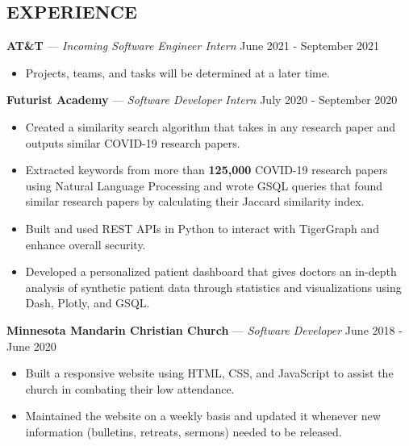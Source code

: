 \documentclass[11pt]{res}
\begin{document}
\begin{footnotesize}
\begin{resume}
\begin{small}
\section{EXPERIENCE}
\end{small}
\vspace{.5mm}
\textbf{AT\&T} — {\sl Incoming Software Engineer Intern} \hfill June 2021 - September 2021\vspace{-5mm}
\begin{itemize}[leftmargin=6.25mm] \itemsep -2pt 
\item Projects, teams, and tasks will be determined at a later time. 
\end{itemize}
\vspace{-2.5mm}
\textbf{Futurist Academy} — {\sl Software Developer Intern} \hfill July 2020 - September 2020\vspace{-5mm}
\begin{itemize}[leftmargin=6.25mm] \itemsep -2pt 
\item Created a similarity search algorithm that takes in any research paper and outputs similar COVID-19 research papers.
\vspace{1mm}
\item Extracted keywords from more than \textbf{125,000} COVID-19 research papers using Natural Language Processing and wrote GSQL queries that found similar research papers by calculating their Jaccard similarity index. 
\vspace{1mm}
\item Built and used REST APIs in Python to interact with TigerGraph and enhance overall security.
\vspace{1mm}
\item Developed a personalized patient dashboard that gives doctors an in-depth analysis of synthetic patient data through statistics and visualizations using Dash, Plotly, and GSQL.
\vspace{1mm}
\end{itemize}
\vspace{-2.5mm}
\textbf{Minnesota Mandarin Christian Church} — {\sl Software Developer} \hfill June 2018 - June 2020\vspace{-5mm}
\begin{itemize}[leftmargin=6.25mm] \itemsep -2pt 
\item Built a responsive website using HTML, CSS, and JavaScript to assist the church in combating their low attendance.
\vspace{1mm}
\item Maintained the website on a weekly basis and updated it whenever new information (bulletins, retreats, sermons) needed to be released. 

\end{itemize}
\end{resume}
\end{footnotesize}
\end{document}
